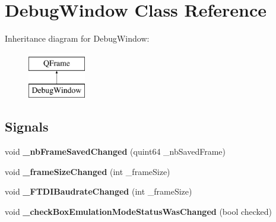 \hypertarget{class_debug_window}{}\section{Debug\+Window Class Reference}
\label{class_debug_window}
Inheritance diagram for Debug\+Window\+:\begin{figure}[H]
\begin{center}
\leavevmode
\includegraphics[height=2.000000cm]{class_debug_window}
\end{center}
\end{figure}
\subsection*{Signals}
\begin{DoxyCompactItemize}
\item 
\mbox{\label{class_debug_window_a1d0660be5eb8e07831e39f2f16261b60}} 
void {\bfseries \+\_\+nb\+Frame\+Saved\+Changed} (quint64 \+\_\+nb\+Saved\+Frame)
\item 
\mbox{\label{class_debug_window_a8699b9262cc802cf959e09f1cbb66581}} 
void {\bfseries \+\_\+frame\+Size\+Changed} (int \+\_\+frame\+Size)
\item 
\mbox{\label{class_debug_window_a2e9adec96d12bca38772213c00be71af}} 
void {\bfseries \+\_\+\+F\+T\+D\+I\+Baudrate\+Changed} (int \+\_\+frame\+Size)
\item 
\mbox{\label{class_debug_window_aa0c8e7825d3803ac70c938d3955c2627}} 
void {\bfseries \+\_\+check\+Box\+Emulation\+Mode\+Status\+Was\+Changed} (bool checked)
\end{DoxyCompactItemize}
